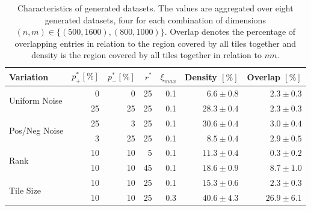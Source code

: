 \begin{table}%
	\centering
	\begin{tabular}{lrrrrrr}\toprule
Variation & $p_+^*[\%]$ & $p_-^*[\%]$ & $r^*$ & $\xi_{max}$ & Density $[\%]$ & Overlap $[\%]$ \\ \midrule
\multirow{2}{*}{Uniform Noise} &
0 & 0 & 25 & 0.1 & $6.6\pm0.8$ & $2.3\pm0.3$\\
& 25 & 25 & 25 & 0.1 & $28.3\pm0.4$ & $2.3\pm0.3$\\ \midrule
\multirow{2}{*}{Pos/Neg Noise} &25 & 3 & 25 & 0.1 & $30.6\pm0.4$ & $3.0\pm0.4$\\
 & 3 & 25 & 25 & 0.1 & $8.5\pm0.4$ & $2.9\pm0.5$\\ \midrule
\multirow{2}{*}{Rank} & 10 & 10 & 5 & 0.1 &  $11.3\pm0.4$ & $0.3\pm0.2$\\
 & 10 & 10 & 45 & 0.1 & $18.6\pm0.9$ & $8.7\pm1.0$\\ \midrule
\multirow{2}{*}{Tile Size} & 10 & 10 & 25 & 0.1 & $15.3\pm0.6$ & $2.3\pm0.3$\\
 & 10 & 10 & 25 & 0.3 & $40.6\pm4.3$ & $26.9\pm6.1$\\\bottomrule
\end{tabular}
\caption{Characteristics of generated datasets. The values are aggregated over eight generated datasets, four for each combination of dimensions $(n,m)\in\{(500,1600),(800,1000)\}$. Overlap denotes the percentage of overlapping entries in relation to the region covered by all tiles together and density is the region covered by all tiles together in relation to $nm$.}\label{tbl:statSynthData}
\end{table}

